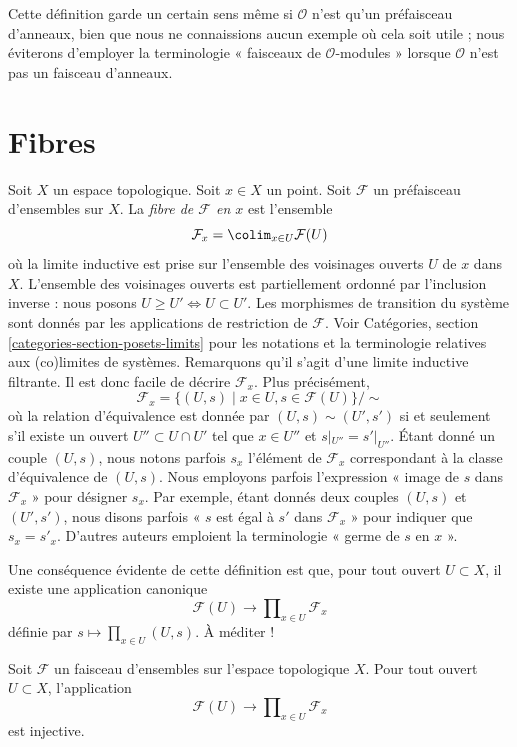 \noindent
Cette définition garde un certain sens même si $\mathcal{O}$ n'est qu'un
préfaisceau d'anneaux, bien que nous ne connaissions aucun exemple où
cela soit utile ; nous éviterons d'employer la terminologie
« faisceaux de $\mathcal{O}$-modules »
lorsque $\mathcal{O}$ n'est pas un faisceau d'anneaux.






\section{Fibres}
\label{section-stalks}

\noindent
Soit $X$ un espace topologique. Soit $x \in X$ un point.
Soit $\mathcal{F}$ un préfaisceau d'ensembles sur $X$.
La {\it fibre de $\mathcal{F}$ en $x$} est l'ensemble
$$
\mathcal{F}_x
=
\colim_{x\in U} \mathcal{F}(U)
$$
où la limite inductive est prise sur l'ensemble des voisinages ouverts
$U$ de $x$ dans $X$. L'ensemble des voisinages ouverts est
partiellement ordonné par l'inclusion inverse :
nous posons $U \geq U' \Leftrightarrow U \subset U'$.
Les morphismes de transition du système sont
donnés par les applications de restriction de $\mathcal{F}$.
Voir Catégories, section \ref{categories-section-posets-limits}
pour les notations et la terminologie relatives aux (co)limites de systèmes.
Remarquons qu'il s'agit d'une limite inductive filtrante.
Il est donc facile de décrire $\mathcal{F}_x$. Plus précisément,
$$
\mathcal{F}_x
=
\{
(U, s)
\mid
x\in U, s\in \mathcal{F}(U)
\}/\sim
$$
où la relation d'équivalence est donnée par $(U, s) \sim (U', s')$ si et seulement s'il
existe un ouvert $U'' \subset U \cap U'$ tel que $x \in U''$ et
$s|_{U''} = s'|_{U''}$. Étant donné un couple $(U, s)$, nous notons parfois
$s_x$ l'élément de $\mathcal{F}_x$ correspondant à la classe d'équivalence
de $(U, s)$. Nous employons parfois l'expression
« image de $s$ dans $\mathcal{F}_x$ » pour désigner $s_x$.
Par exemple, étant donnés deux couples $(U, s)$ et $(U', s')$, nous disons parfois
« $s$ est égal à $s'$ dans $\mathcal{F}_x$ » pour indiquer
que $s_x = s'_x$. D'autres auteurs emploient la terminologie
« germe de $s$ en $x$ ».

\medskip\noindent
Une conséquence évidente de cette définition est que,
pour tout ouvert $U \subset X$, il existe une application canonique
$$
\mathcal{F}(U)
\longrightarrow
\prod\nolimits_{x \in U} \mathcal{F}_x
$$
définie par $s \mapsto \prod_{x \in U} (U, s)$. À méditer !

\begin{lemma}
\label{lemma-sheaf-subset-stalks}
Soit $\mathcal{F}$ un faisceau d'ensembles sur l'espace topologique $X$.
Pour tout ouvert $U \subset X$, l'application
$$
\mathcal{F}(U)
\longrightarrow
\prod\nolimits_{x \in U} \mathcal{F}_x
$$
est injective.
\end{lemma}

